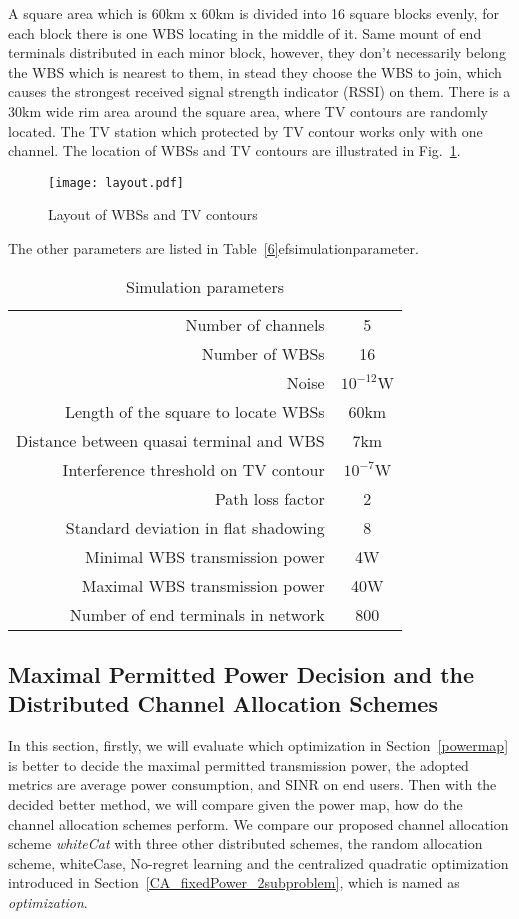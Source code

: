 A square area which is 60km x 60km is divided into 16 square blocks evenly, for each block there is one WBS locating in the middle of it. 
Same mount of end terminals distributed in each minor block, however, they don't necessarily belong the WBS which is nearest to them, in stead they choose the WBS to join, which causes the strongest received signal strength indicator (RSSI) on them.
There is a 30km wide rim area around the square area, where TV contours are randomly located.
The TV station which protected by TV contour works only with one channel. 
The location of WBSs and TV contours are illustrated in Fig.~\ref{sim:layout}.
\begin{figure}[h!]
  \centering
  \texttt{[image: layout.pdf]}
  \caption{Layout of WBSs and TV contours}
  \label{sim:layout}
\end{figure}
The other parameters are listed in Table~\ref{6}ef{simulationparameter}. 

\begin{table}[!h]
\centering
\begin{tabular}{|r|c|}
  \hline
  Number of channels 						& 5 \\
  Number of WBSs							& 16\\
  Noise 									& $10^{-12}$W \\ %
  Length of the square to locate WBSs		& 60km\\
  Distance between quasai terminal and WBS 	& 7km \\
  Interference threshold on TV contour 		& $10^{-7}$W \\ %
  Path loss factor 							& 2 \\
  Standard deviation in flat shadowing		& 8\\
  Minimal WBS transmission power 			& 4W \\
  Maximal WBS transmission power 			& 40W \\
  Number of end terminals in network 		& 800 \\
  \hline
\end{tabular}
\caption{Simulation parameters}
\label{simulationparameter}
\end{table}

\subsection{Maximal Permitted Power Decision and the Distributed Channel Allocation Schemes}
In this section, firstly, we will evaluate which optimization in Section~\ref{powermap} is better to decide the maximal permitted transmission power, the adopted metrics are average power consumption, and SINR on end users.
Then with the decided better method, we will compare given the power map, how do the channel allocation schemes perform.
We compare our proposed channel allocation scheme \textit{whiteCat} with three other distributed schemes, the random allocation scheme, whiteCase, No-regret learning and the centralized quadratic optimization introduced in Section~\ref{CA_fixedPower_2subproblem}, which is named as \textit{optimization}.


